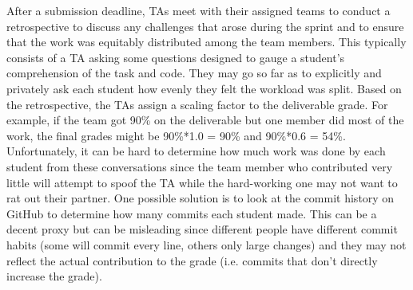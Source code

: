 \documentclass[preprint,journal]{vgtc}       %
\begin{document}
After a submission deadline, TAs meet with their assigned
teams to conduct a retrospective to discuss any challenges that arose
during the sprint and to ensure that the work was equitably distributed among the
team members. This typically consists of a TA asking some questions designed to
gauge a student's comprehension of the task and code. They may go so far as to
explicitly and privately ask each student how evenly they felt the workload was
split. Based on the retrospective, the TAs assign a scaling factor to the deliverable grade. For example, if
the team got 90\% on the deliverable but one member did most of the work, the final
grades might be 90\%*1.0 = 90\% and 90\%*0.6 = 54\%. Unfortunately, it can be hard
to determine how much work was done by each student from these conversations since
the team member who contributed very little will attempt to spoof the TA while the
hard-working one may not want to rat out their partner. One possible solution is
to look at the commit history on GitHub to determine how many commits each student
made. This can be a decent proxy but can be misleading since different people have
different commit habits (some will commit every line, others only large changes)
and they may not reflect the actual contribution to the grade (i.e. commits that
don't directly increase the grade).

\end{document}
